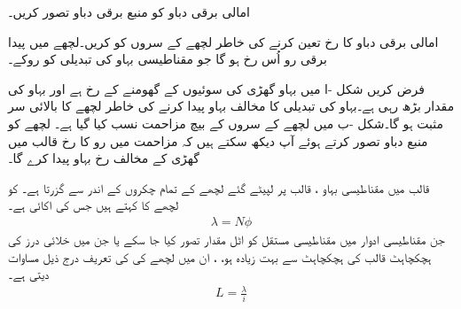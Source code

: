 امالی برقی دباو کو منبع برقی دباو تصور کریں۔

امالی برقی دباو  کا رخ تعین کرنے کی خاطر  لچھے کے سروں کو    کریں۔لچھے میں پیدا برقی رو اُس رخ  ہو گا جو مقناطیسی بہاو کی تبدیلی کو روکے۔

 فرض کریں شکل -ا میں بہاو   گھڑی کی سوئیوں کے گھومنے کے رخ ہے  اور  بہاو کی مقدار بڑھ رہی ہے۔بہاو کی تبدیلی کا مخالف بہاو  پیدا کرنے کی خاطر لچھے کا بالائی سر مثبت  ہو گا۔شکل -ب میں لچھے کے سروں کے بیچ مزاحمت نسب کیا گیا ہے۔ لچھے کو منبع دباو تصور کرتے ہوئے  آپ دیکھ سکتے ہیں کہ مزاحمت میں رو کا رخ قالب میں گھڑی کے مخالف رخ بہاو  پیدا کرے گا۔

قالب میں مقناطیسی بہاو ، قالب پر لپیٹے گئے لچھے کے تمام چکروں  کے اندر سے گزرتا ہے۔ کو لچھے کا    کہتے ہیں جس کی اکائی   ہے۔
\begin{align}
\lambda=N\phi
\end{align}
جن مقناطیسی ادوار میں مقناطیسی مستقل   کو اٹل مقدار تصور کیا جا سکے یا جن میں خلائی درز کی ہچکچاہٹ قالب کی ہچکچاہٹ سے بہت زیادہ ہو، ،  ان میں لچھے کی     کی تعریف درج ذیل مساوات دیتی ہے۔
\begin{align}\label{مساوات_مقناطیسی_دور_خود_امالہ_تعریف}
L=\frac{\lambda}{i}
\end{align}

